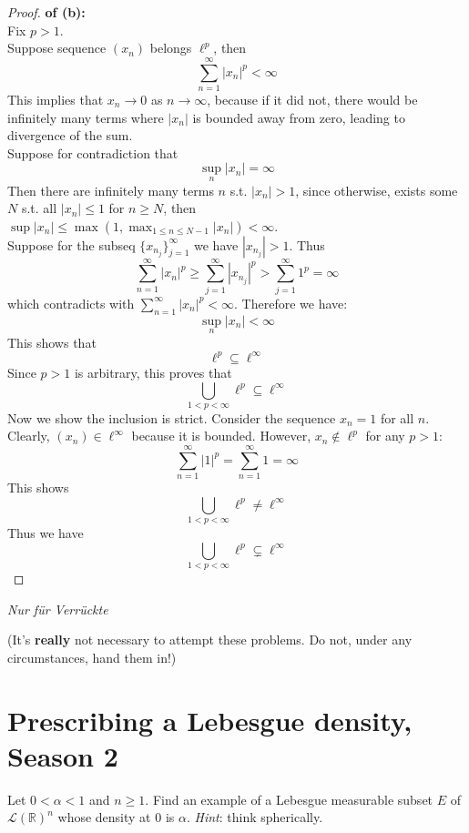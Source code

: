 \documentclass[lang=cn,11pt]{elegantbook}
\begin{document}
    
\begin{proof}
    \textbf{of (b):}\\
Fix $p>1$.\\
Suppose sequence \(( x_n) \) belongs \(\ell^p\), then \[
\sum_{n=1}^{\infty} |x_n|^p < \infty
\]
This implies that \( x_n \to 0 \) as \( n \to \infty \), because if it did not, there would be infinitely many terms where \( |x_n| \) is bounded away from zero, leading to divergence of the sum.\\
Suppose for contradiction that \[
\sup_{n} |x_n| = \infty
\]Then there are infinitely many terms $n$ s.t. $|x_n| > 1$, since otherwise, exists some $N$ s.t. all $|x_n| \leq 1$ for $n\geq N$, then $\sup |x_n|\leq \max(1, \max_{1\leq n \leq N-1} |x_n| )< \infty$.\\
Suppose for the subseq $\{x_{n_j}\}_{j=1}^\infty$ we have $|x_{n_j}| > 1$. Thus \[
\sum_{n=1}^{\infty} |x_n|^p  \geq \sum_{j=1}^{\infty} |x_{n_j}|^p > \sum_{j=1}^{\infty} 1^p = \infty
\]which contradicts with \(\sum_{n=1}^{\infty} |x_n|^p < \infty\). Therefore we have: \[
\sup_{n} |x_n| < \infty
\]
This shows that \[
\ell^p \subseteq \ell^\infty
\] Since $p>1$ is arbitrary, this proves that \[
\bigcup_{1<p<\infty} \ell^p \subseteq \ell^\infty
\]Now we show the inclusion is strict. Consider the sequence \( x_n = 1 \) for all \( n \). Clearly, \(( x_n)\in \ell^\infty \) because it is bounded. However, \( x_n \notin \ell^p \) for any \( p > 1 \):
\[
\sum_{n=1}^{\infty} |1|^p = \sum_{n=1}^{\infty} 1 = \infty
\]
This shows \[
\bigcup_{1<p<\infty} \ell^p \not =  \ell^\infty
\]Thus we have \[
\bigcup_{1<p<\infty} \ell^p \subsetneq \ell^\infty
\]
\end{proof}




\vspace*{10mm}

\begin{center}
  \textit{Nur f\"ur Verr\"uckte}
\end{center}
(It's \textbf{really} not necessary to attempt these problems. Do not, under any circumstances, hand them in!) 

\section{Prescribing a Lebesgue density, Season 2}
  Let $0<\alpha <1$ and $n\ge 1$. 
    Find an example of a Lebesgue measurable subset $E$ of $\mathcal{L}(\mathbb{R})^n$ whose density at $0$ is $\alpha$.
    \textit{Hint}: think spherically.
\end{document}
